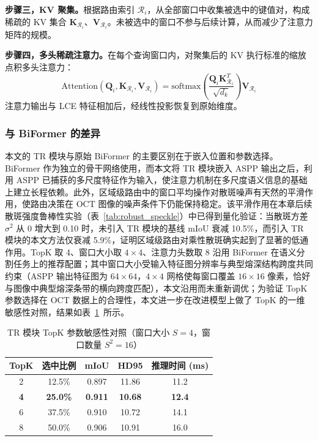 \textbf{步骤三，KV 聚集。}根据路由索引 $\mathcal{R}_i$，从全部窗口中收集被选中的键值对，构成稀疏的 KV 集合 $\mathbf{K}_{\mathcal{R}_i}$、$\mathbf{V}_{\mathcal{R}_i}$。未被选中的窗口不参与后续计算，从而减少了注意力矩阵的规模。

\textbf{步骤四，多头稀疏注意力。}在每个查询窗口内，对聚集后的 KV 执行标准的缩放点积多头注意力：
\begin{equation}
\text{Attention}(\mathbf{Q}_i, \mathbf{K}_{\mathcal{R}_i}, \mathbf{V}_{\mathcal{R}_i}) = \text{softmax}\!\left(\frac{\mathbf{Q}_i \mathbf{K}_{\mathcal{R}_i}^T}{\sqrt{d_k}}\right) \mathbf{V}_{\mathcal{R}_i}
\label{eq:fine_attention}
\end{equation}
注意力输出与 LCE 特征相加后，经线性投影恢复到原始维度。

\subsubsection{与 BiFormer 的差异}

本文的 TR 模块与原始 BiFormer 的主要区别在于嵌入位置和参数选择。BiFormer 作为独立的骨干网络使用，而本文将 TR 模块嵌入 ASPP 输出之后，利用 ASPP 已捕获的多尺度特征作为输入，使注意力机制在多尺度语义信息的基础上建立长程依赖。此外，区域级路由中的窗口平均操作对散斑噪声有天然的平滑作用，使路由决策在 OCT 图像的噪声条件下仍能保持稳定。该平滑作用在本章后续散斑强度鲁棒性实验（表~\ref{tab:robust_speckle}）中已得到量化验证：当散斑方差 $\sigma^2$ 从 0 增大到 0.10 时，未引入 TR 模块的基线 mIoU 衰减 10.5\%，而引入 TR 模块的本文方法仅衰减 5.9\%，证明区域级路由对乘性散斑确实起到了显著的低通作用。TopK 取 4、窗口大小取 $4 \times 4$、注意力头数取 8 沿用 BiFormer 在语义分割任务上的推荐配置；其中窗口大小受输入特征图分辨率与典型熔深结构跨度共同约束（ASPP 输出特征图为 $64\times 64$，$4\times 4$ 网格使每窗口覆盖 $16\times 16$ 像素，恰好与图像中典型熔深条带的横向跨度匹配），本文沿用而未重新调优；为验证 TopK 参数选择在 OCT 数据上的合理性，本文进一步在改进模型上做了 TopK 的一维敏感性对照，结果如表~\ref{tab:topk_sensitivity}~所示。

\begin{table}[htbp]
\centering
\renewcommand\arraystretch{1.4}
\caption{TR 模块 TopK 参数敏感性对照（窗口大小 $S=4$，窗口数量 $S^2=16$）}
\label{tab:topk_sensitivity}
\begin{tabular}{ccccc}
\toprule
TopK & 选中比例 & mIoU & HD95 & 推理时间 (ms) \\
\midrule
2          & 12.5\% & 0.897 & 11.86 & 11.2 \\
\textbf{4} & \textbf{25.0\%} & \textbf{0.911} & \textbf{10.68} & \textbf{12.4} \\
6          & 37.5\% & 0.910 & 10.72 & 14.1 \\
8          & 50.0\% & 0.906 & 10.91 & 16.0 \\
\bottomrule
\end{tabular}
\end{table}

